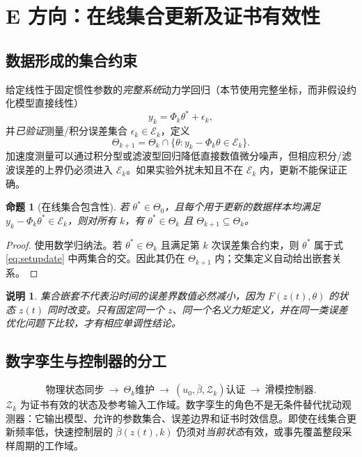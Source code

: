 \documentclass[journal,onecolumn]{IEEEtran}
\newtheorem{proposition}{命题}[section]
\newtheorem{remark}{说明}[section]
\begin{document}
\section{E 方向：在线集合更新及证书有效性}
\subsection{数据形成的集合约束}
给定线性于固定惯性参数的\emph{完整系统}动力学回归（本节使用完整坐标，而非假设约化模型直接线性）
\begin{equation}
 y_k=\Phi_k\theta^\ast+\epsilon_k,
\end{equation}
并\emph{已验证}测量/积分误差集合 $\epsilon_k\in\mathcal E_k$，定义
\begin{equation}
 \Theta_{k+1}=\Theta_k\cap\{\theta:y_k-\Phi_k\theta\in\mathcal E_k\}.
 \label{eq:setupdate}
\end{equation}
加速度测量可以通过积分型或滤波型回归降低直接数值微分噪声，但相应积分/滤波误差的上界仍必须进入 $\mathcal E_k$。如果实验外扰未知且不在 $\mathcal E_k$ 内，更新不能保证正确。
\begin{proposition}[在线集合包含性]
若 $\theta^\ast\in\Theta_0$，且每个用于更新的数据样本均满足 $y_k-\Phi_k\theta^\ast\in\mathcal E_k$，则对所有 $k$，有 $\theta^\ast\in\Theta_k$ 且 $\Theta_{k+1}\subseteq\Theta_k$。
\end{proposition}
\begin{proof}
使用数学归纳法。若 $\theta^\ast\in\Theta_k$ 且满足第 $k$ 次误差集合约束，则 $\theta^\ast$ 属于式 \eqref{eq:setupdate} 中两集合的交。因此其仍在 $\Theta_{k+1}$ 内；交集定义自动给出嵌套关系。
\end{proof}
\begin{remark}
集合嵌套不代表\emph{沿时间的误差界数值必然减小}，因为 $F(z(t),\theta)$ 的状态 $z(t)$ 同时改变。只有固定同一个 $z$、同一个名义力矩定义，并在同一类误差优化问题下比较，才有相应单调性结论。
\end{remark}

\subsection{数字孪生与控制器的分工}
\begin{equation}
 \boxed{\text{物理状态同步}\ \longrightarrow\ \Theta_k\text{维护}\ \longrightarrow\ (u_0,\bar\beta,\mathcal Z_k)\text{认证}\ \longrightarrow\ \text{滑模控制器}.}
\end{equation}
$\mathcal Z_k$ 为证书有效的状态及参考输入工作域。数字孪生的角色不是无条件替代扰动观测器：它输出模型、允许的参数集合、误差边界和证书时效信息。即使在线集合更新频率低，快速控制层的 $\bar\beta(z(t),k)$ 仍须对\emph{当前状态}有效，或事先覆盖整段采样周期的工作域。
\end{document}
